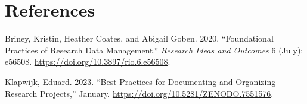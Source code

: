 \documentclass[
  letterpaper,
  DIV=11,
  numbers=noendperiod]{scrreprt}
\newlength{\cslhangindent}
\newlength{\cslentryspacingunit} %
\newenvironment{CSLReferences}[2] %
 {%
  \setlength{\parindent}{0pt}
  \ifodd #1
  \let\oldpar\par
  \def\par{\hangindent=\cslhangindent\oldpar}
  \fi
  \setlength{\parskip}{#2\cslentryspacingunit}
 }%
 {}
\begin{document}

\hypertarget{references}{%
\chapter*{References}\label{references}}


\hypertarget{refs}{}
\begin{CSLReferences}{1}{0}
\leavevmode{}%
Briney, Kristin, Heather Coates, and Abigail Goben. 2020.
{``Foundational Practices of Research Data Management.''} \emph{Research
Ideas and Outcomes} 6 (July): e56508.
\url{https://doi.org/10.3897/rio.6.e56508}.

\leavevmode{}%
Klapwijk, Eduard. 2023. {``Best Practices for Documenting and Organizing
Research Projects,''} January.
\url{https://doi.org/10.5281/ZENODO.7551576}.

\end{CSLReferences}
\end{document}
